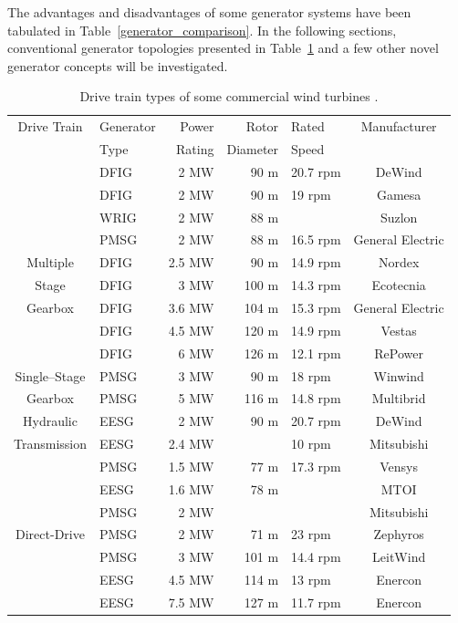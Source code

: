 \documentclass[a4paper, 11pt]{article} %
\begin{document}
The advantages and disadvantages of some generator systems have been tabulated in Table~\ref{generator_comparison}. In the following sections,  conventional generator topologies presented in Table~\ref{generator_manufacturers} and a few other novel generator concepts will be investigated.

\begin{table}
  \centering
  \begin{tabular}{clrrlc}
	  
	  Drive Train & Generator & Power & Rotor & Rated & Manufacturer \\
	   & Type & Rating & Diameter & Speed & \\
	  \hline
		& DFIG & 2 MW & 90 m & 20.7 rpm & DeWind \\
		& DFIG & 2 MW & 90 m & 19 rpm & Gamesa \\
	  	& WRIG & 2 MW & 88 m &  & Suzlon \\
	  	& PMSG & 2 MW & 88 m & 16.5 rpm & General Electric \\
	 Multiple 	& DFIG & 2.5 MW & 90 m & 14.9 rpm & Nordex \\
	Stage  	& DFIG & 3 MW & 100 m & 14.3 rpm & Ecotecnia \\
  	Gearbox & DFIG & 3.6 MW & 104 m & 15.3 rpm & General Electric \\
	  	& DFIG & 4.5 MW & 120 m & 14.9 rpm & Vestas \\
	  	& DFIG & 6 MW & 126 m & 12.1 rpm & RePower \\
	  	\hline
	Single--Stage  	& PMSG & 3 MW & 90 m & 18 rpm & Winwind \\
	Gearbox  	& PMSG & 5 MW & 116 m & 14.8 rpm & Multibrid \\
	  	\hline
	 Hydraulic 	& EESG & 2 MW & 90 m & 20.7 rpm & DeWind \\
	 Transmission 	& EESG & 2.4 MW &  & 10 rpm & Mitsubishi \\
	  	\hline
	  	& PMSG & 1.5 MW & 77 m & 17.3 rpm & Vensys \\
	  	& EESG & 1.6 MW & 78 m &  & MTOI \\
	  	& PMSG & 2 MW &  &  & Mitsubishi \\
	Direct-Drive  	& PMSG & 2 MW & 71 m & 23 rpm & Zephyros \\
	  	& PMSG & 3 MW & 101 m & 14.4 rpm & LeitWind \\
	  	& EESG & 4.5 MW & 114 m & 13 rpm & Enercon \\
	  	& EESG & 7.5 MW & 127 m & 11.7 rpm & Enercon \\
	  \hline

  \end{tabular}
  \caption{Drive train types of some commercial wind turbines \cite{wind_energy_facts,upwind2011}.}
  \label{generator_manufacturers}
\end{table}
\end{document}

